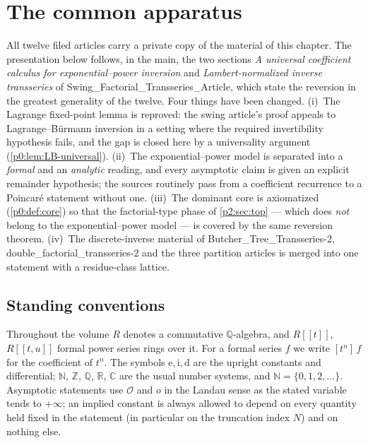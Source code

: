 \documentclass[11pt,a4paper,oneside]{book}
\theoremstyle{plain}
\theoremstyle{definition}
\theoremstyle{remark}
\newcommand{\Nat}{\mathbb{N}}
\newcommand{\Int}{\mathbb{Z}}
\newcommand{\Rat}{\mathbb{Q}}
\newcommand{\Real}{\mathbb{R}}
\newcommand{\Cplx}{\mathbb{C}}
\newcommand{\e}{\mathrm{e}}
\newcommand{\ii}{\mathrm{i}}
\newcommand{\dd}{\mathrm{d}}
\newcommand{\Coef}[1]{[#1]\,}
\newcommand{\bigO}{\mathcal{O}}
\newcommand{\littleo}{o}
\begin{document}
\tableofcontents

\mainmatter

\chapter{The common apparatus}\label{p0:sec:top}

\begin{sourcebox}
All twelve filed articles carry a private copy of the material of this
chapter.  The presentation below follows, in the main, the two sections
\emph{A universal coefficient calculus for exponential--power inversion} and
\emph{Lambert-normalized inverse transseries} of
\textsf{Swing\_Factorial\_Transseries\_Article}, which state the reversion in
the greatest generality of the twelve.  Four things have been changed.
(i)~The Lagrange fixed-point lemma is reproved: the swing article's proof
appeals to Lagrange--B\"urmann inversion in a setting where the required
invertibility hypothesis fails, and the gap is closed here by a universality
argument (\cref{p0:lem:LB-universal}).
(ii)~The exponential--power model is separated into a \emph{formal} and an
\emph{analytic} reading, and every asymptotic claim is given an explicit
remainder hypothesis; the sources routinely pass from a coefficient recurrence
to a Poincar\'e statement without one.
(iii)~The dominant core is axiomatized (\cref{p0:def:core}) so that the
factorial-type phase of \cref{p2:sec:top} --- which does \emph{not} belong to
the exponential--power model --- is covered by the same reversion theorem.
(iv)~The discrete-inverse material of
\textsf{Butcher\_Tree\_Transseries-2},
\textsf{double\_factorial\_transseries-2} and the three partition articles is
merged into one statement with a residue-class lattice.
\end{sourcebox}

\section{Standing conventions}\label{p0:sec:conventions}

Throughout the volume $R$ denotes a commutative $\Rat$-algebra, and
$R[[t]]$, $R[[t,u]]$ formal power series rings over it.  For a formal series
$f$ we write $\Coef{t^n}f$ for the coefficient of $t^n$.  The symbols
$\e,\ii,\dd$ are the upright constants and differential; $\Nat$, $\Int$,
$\Rat$, $\Real$, $\Cplx$ are the usual number systems, and
$\Nat=\{0,1,2,\dots\}$.  Asymptotic statements use $\bigO$ and
$\littleo$ in the Landau sense as the stated variable tends to
$+\infty$; an implied constant is always allowed to depend on every quantity
held fixed in the statement (in particular on the truncation index $N$) and on
nothing else.
\end{document}
